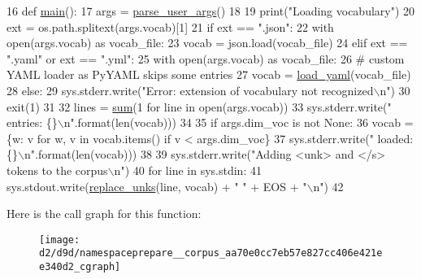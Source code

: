 \begin{DoxyCode}
16 \textcolor{keyword}{def }\hyperlink{namespaceprepare__corpus_aa70e0cc7eb57e827cc406e421ee340d2}{main}():
17     args = \hyperlink{namespaceprepare__corpus_a8cd0e0b6ee5199bd8838a625ef5803b9}{parse\_user\_args}()
18 
19     print(\textcolor{stringliteral}{"Loading vocabulary"})
20     ext = os.path.splitext(args.vocab)[1]
21     \textcolor{keywordflow}{if} ext == \textcolor{stringliteral}{".json"}:
22         with open(args.vocab) \textcolor{keyword}{as} vocab\_file:
23             vocab = json.load(vocab\_file)
24     \textcolor{keywordflow}{elif} ext == \textcolor{stringliteral}{".yaml"} \textcolor{keywordflow}{or} ext == \textcolor{stringliteral}{".yml"}:
25         with open(args.vocab) \textcolor{keyword}{as} vocab\_file:
26             \textcolor{comment}{# custom YAML loader as PyYAML skips some entries}
27             vocab = \hyperlink{namespaceprepare__corpus_a41cd95c2147ad4e9b6486dbb66b6b87b}{load\_yaml}(vocab\_file)
28     \textcolor{keywordflow}{else}:
29         sys.stderr.write(\textcolor{stringliteral}{"Error: extension of vocabulary not recognized\(\backslash\)n"})
30         exit(1)
31 
32     lines = \hyperlink{namespacemarian_a460460a6de63beebc5d968b44d49d11b}{sum}(1 \textcolor{keywordflow}{for} line \textcolor{keywordflow}{in} open(args.vocab))
33     sys.stderr.write(\textcolor{stringliteral}{"  entries: \{\}\(\backslash\)n"}.format(len(vocab)))
34 
35     \textcolor{keywordflow}{if} args.dim\_voc \textcolor{keywordflow}{is} \textcolor{keywordflow}{not} \textcolor{keywordtype}{None}:
36         vocab = \{w: v \textcolor{keywordflow}{for} w, v \textcolor{keywordflow}{in} vocab.items() \textcolor{keywordflow}{if} v < args.dim\_voc\}
37         sys.stderr.write(\textcolor{stringliteral}{"  loaded: \{\}\(\backslash\)n"}.format(len(vocab)))
38 
39     sys.stderr.write(\textcolor{stringliteral}{"Adding <unk> and </s> tokens to the corpus\(\backslash\)n"})
40     \textcolor{keywordflow}{for} line \textcolor{keywordflow}{in} sys.stdin:
41         sys.stdout.write(\hyperlink{namespaceprepare__corpus_a94500e5ed125979793ade8632786b6c3}{replace\_unks}(line, vocab) + \textcolor{stringliteral}{" "} + EOS + \textcolor{stringliteral}{"\(\backslash\)n"})
42 
\end{DoxyCode}


Here is the call graph for this function\+:
\nopagebreak
\begin{figure}[H]
\begin{center}
\leavevmode
\texttt{[image: d2/d9d/namespaceprepare\_\_corpus\_aa70e0cc7eb57e827cc406e421ee340d2\_cgraph]}
\end{center}
\end{figure}




